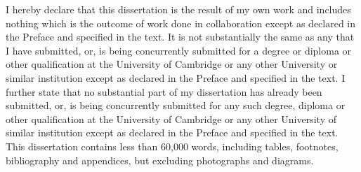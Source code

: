 
\begin{declaration}

I hereby declare that this dissertation is the result of my own work and includes nothing which is the outcome of work done in collaboration except as declared in the Preface and specified in the text. It is not substantially the same as any that I have submitted, or, is being concurrently submitted for a degree or diploma or other qualification at the University of Cambridge or any other University or similar institution except as declared in the Preface and specified in the text. I further state that no substantial part of my dissertation has already been submitted, or, is being concurrently submitted for any such degree, diploma or other qualification at the University of Cambridge or any other University of similar institution except as declared in the Preface and specified in the text. This dissertation contains less than 60,000 words, including tables, footnotes, bibliography and appendices, but excluding photographs and diagrams. 


\end{declaration}

